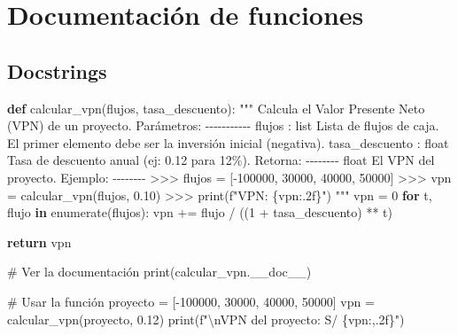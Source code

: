 \documentclass[
  doc,
  floatsintext,
  longtable,
  a4paper,
  nolmodern,
  notxfonts,
  notimes,
  12pt,
  colorlinks=true,linkcolor=blue,citecolor=blue,urlcolor=blue]{apa7}
\newenvironment{Shaded}{\begin{snugshade}}{\end{snugshade}}
\newcommand{\BuiltInTok}[1]{\textcolor[rgb]{0.00,0.23,0.31}{#1}}
\newcommand{\CharTok}[1]{\textcolor[rgb]{0.13,0.47,0.30}{#1}}
\newcommand{\CommentTok}[1]{\textcolor[rgb]{0.37,0.37,0.37}{#1}}
\newcommand{\ControlFlowTok}[1]{\textcolor[rgb]{0.00,0.23,0.31}{\textbf{#1}}}
\newcommand{\DecValTok}[1]{\textcolor[rgb]{0.68,0.00,0.00}{#1}}
\newcommand{\FloatTok}[1]{\textcolor[rgb]{0.68,0.00,0.00}{#1}}
\newcommand{\KeywordTok}[1]{\textcolor[rgb]{0.00,0.23,0.31}{\textbf{#1}}}
\newcommand{\NormalTok}[1]{\textcolor[rgb]{0.00,0.23,0.31}{#1}}
\newcommand{\OperatorTok}[1]{\textcolor[rgb]{0.37,0.37,0.37}{#1}}
\newcommand{\SpecialCharTok}[1]{\textcolor[rgb]{0.37,0.37,0.37}{#1}}
\newcommand{\SpecialStringTok}[1]{\textcolor[rgb]{0.13,0.47,0.30}{#1}}
\begin{document}
\section{Documentación de
funciones}\label{documentaciuxf3n-de-funciones}

\subsection{Docstrings}\label{docstrings}

\begin{Shaded}
\begin{Highlighting}[]
\KeywordTok{def}\NormalTok{ calcular\_vpn(flujos, tasa\_descuento):}
    \CommentTok{"""}
\CommentTok{    Calcula el Valor Presente Neto (VPN) de un proyecto.}
\CommentTok{    }
\CommentTok{    Parámetros:}
\CommentTok{    {-}{-}{-}{-}{-}{-}{-}{-}{-}{-}{-}}
\CommentTok{    flujos : list}
\CommentTok{        Lista de flujos de caja. El primer elemento debe ser la inversión inicial (negativa).}
\CommentTok{    tasa\_descuento : float}
\CommentTok{        Tasa de descuento anual (ej: 0.12 para 12\%).}
\CommentTok{    }
\CommentTok{    Retorna:}
\CommentTok{    {-}{-}{-}{-}{-}{-}{-}{-}}
\CommentTok{    float}
\CommentTok{        El VPN del proyecto.}
\CommentTok{    }
\CommentTok{    Ejemplo:}
\CommentTok{    {-}{-}{-}{-}{-}{-}{-}{-}}
\CommentTok{    \textgreater{}\textgreater{}\textgreater{} flujos = [{-}100000, 30000, 40000, 50000]}
\CommentTok{    \textgreater{}\textgreater{}\textgreater{} vpn = calcular\_vpn(flujos, 0.10)}
\CommentTok{    \textgreater{}\textgreater{}\textgreater{} print(f"VPN: \{vpn:.2f\}")}
\CommentTok{    """}
\NormalTok{    vpn }\OperatorTok{=} \DecValTok{0}
    \ControlFlowTok{for}\NormalTok{ t, flujo }\KeywordTok{in} \BuiltInTok{enumerate}\NormalTok{(flujos):}
\NormalTok{        vpn }\OperatorTok{+=}\NormalTok{ flujo }\OperatorTok{/}\NormalTok{ ((}\DecValTok{1} \OperatorTok{+}\NormalTok{ tasa\_descuento) }\OperatorTok{**}\NormalTok{ t)}
    
    \ControlFlowTok{return}\NormalTok{ vpn}

\CommentTok{\# Ver la documentación}
\BuiltInTok{print}\NormalTok{(calcular\_vpn.\_\_doc\_\_)}

\CommentTok{\# Usar la función}
\NormalTok{proyecto }\OperatorTok{=}\NormalTok{ [}\OperatorTok{{-}}\DecValTok{100000}\NormalTok{, }\DecValTok{30000}\NormalTok{, }\DecValTok{40000}\NormalTok{, }\DecValTok{50000}\NormalTok{]}
\NormalTok{vpn }\OperatorTok{=}\NormalTok{ calcular\_vpn(proyecto, }\FloatTok{0.12}\NormalTok{)}
\BuiltInTok{print}\NormalTok{(}\SpecialStringTok{f"}\CharTok{\textbackslash{}n}\SpecialStringTok{VPN del proyecto: S/ }\SpecialCharTok{\{}\NormalTok{vpn}\SpecialCharTok{:,.2f\}}\SpecialStringTok{"}\NormalTok{)}
\end{Highlighting}
\end{Shaded}
\end{document}
